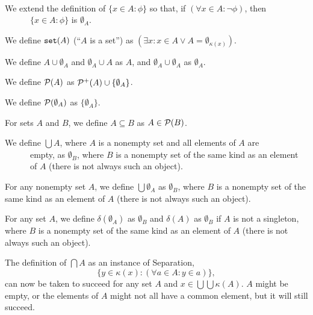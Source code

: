 \documentclass[12pt]{article}
\begin{document}
\begin{dfn}\mbox{\negthinspace}\\

  We extend the definition of $\{x \in A:\phi\}$ so that, if $(\forall
  x \in A :\neg \phi)$, then\\ \mbox{\, \, \, \, } $\{x \in A:\phi\}$ is $\emptyset_A$.

We define ${\tt set}(A)$ (``$A$ is a set'') as $(\exists x:x \in A \vee A = \emptyset_{\kappa(x)})$.  

We define $A \cup \emptyset_A$ and $\emptyset_A \cup A$ as $A$, and
$\emptyset_A \cup \emptyset_A$ as $\emptyset_A$.

We define ${\cal P}(A)$ as ${\cal P}^+(A) \cup \{\emptyset_A\}$.

We define ${\cal P}(\emptyset_A)$ as $\{\emptyset_A\}$.

For sets $A$ and $B$, we define $A \subseteq B$ as $A \in {\cal P}(B)$. 

We define $\bigcup A$, where $A$ is a nonempty set and all elements of $A$ are\\ \mbox{\, \, \, \, } empty,  as $\emptyset_B$, where $B$ is a nonempty set of the same kind as an element\\ \mbox{\, \, \, \, } of $A$ (there is not always such an object).

For any nonempty set $A$, we define $\bigcup \emptyset_A$ as $\emptyset_B$, where $B$ is a nonempty set of the same kind as an element of $A$ (there is not always such an object). %

For any set $A$, we define $\delta(\emptyset_A)$ as $\emptyset_B$ and $\delta(A)$ as $\emptyset_B$ if $A$ is not a singleton, where $B$ is a nonempty set of the same kind as an element of $A$ (there is not always such an object). 

\end{dfn}

The definition of $\bigcap A$ as an instance of Separation,  $$\{y \in \kappa(x):(\forall a \in A:y \in a)\},$$ can now be taken to succeed for any set $A$ and $x \in \bigcup\bigcup \kappa(A)$.  $A$ might be empty, or the elements of $A$ might not all have a common element, but it will still succeed.
\end{document}
